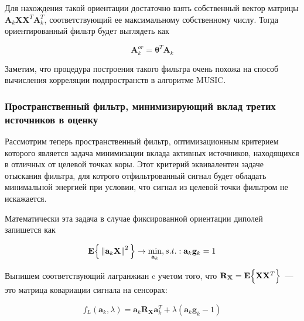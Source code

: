 Для нахождения такой ориентации достаточно взять собственный вектор матрицы
$\mathbf{A}_k \mathbf{X}\mathbf{X}^T \mathbf{A}_k^T$,
соответствующий ее максимальному собственному числу.
Тогда ориентированный фильтр будет выглядеть как

\begin{equation}
    \mathbf{A}_{k}^{or} = \boldsymbol{\theta}^T \mathbf{A}_k
\end{equation}

Заметим, что процедура построения такого фильтра очень похожа на способ
вычисления корреляции подпространств в алгоритме MUSIC\@.

\subsubsection{Пространственный фильтр, минимизирующий вклад третих источников в оценку}

Рассмотрим теперь пространственный фильтр,
оптимизационным критерием которого является задача минимизации
вклада активных источников, находящихся в отличных от целевой точках коры.
Этот критерий эквивалентен задаче отыскания фильтра, для котрого отфильтрованный
сигнал будет обладать минимальной энергией при условии, что
сигнал из целевой точки фильтром не искажается.

Математически эта задача в случае фиксированной ориентации диполей запишется как

\begin{equation}
    \mathbf{E}\Big\{\left\lVert\mathbf{a}_k \mathbf{X}\right\rVert^2\Big\}
    \rightarrow \underset{\mathbf{a}_k}{\min},
    s.t.: \mathbf{a}_k \mathbf{g}_k = 1
    \label{lcmv_objective_nonreg}
\end{equation}

Выпишем соответствующий лагранжиан c учетом того,
что $\mathbf{R}_{\mathbf{X}} = \mathbf{E}\Big\{\mathbf{X}\mathbf{X}^T\Big\}$~---
это матрица ковариации сигнала на сенсорах:

\begin{equation}
    f_L(\mathbf{a}_k, \lambda) = \mathbf{a}_k \mathbf{R}_{\mathbf{X}} \mathbf{a}_k^T +
                                 \lambda (\mathbf{a}_k \mathbf{g}_k - 1)
\end{equation}


